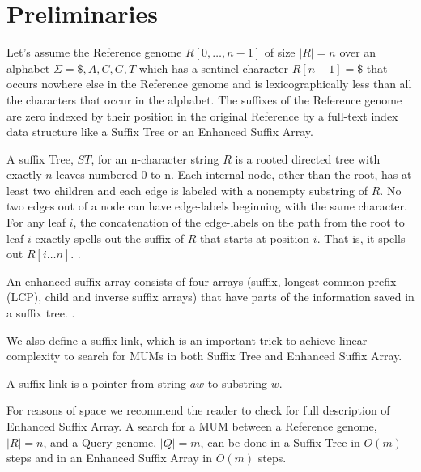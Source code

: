 \documentclass[runningheads,a5paper]{llncs}
\begin{document}
\section{Preliminaries}
Let's assume the Reference genome $R[0,\ldots, n-1]$ of size $|R|=n$ over an alphabet $\Sigma={ \$, A, C, G, T}$ which has a sentinel character $R[n-1] = \$$ that occurs nowhere else in the Reference genome and is lexicographically less than all the characters that occur in the alphabet. The suffixes of the Reference genome are zero indexed by their position in the original Reference by a full-text index data structure like a Suffix Tree or an Enhanced Suffix Array. 
\begin{definition}
A suffix Tree, $ST$, for an n-character string $R$ is a rooted directed tree with exactly $n$ leaves numbered 0 to n. Each internal node, other than the root, has at least two children and each edge is labeled with a nonempty substring of $R$. No two edges out of a node can have edge-labels beginning with the same character. For any leaf $i$, the concatenation of the edge-labels on the path from the root to leaf $i$ exactly spells out the suffix of $R$ that starts at position $i$. That is, it spells out $R[i\ldots n]$. \cite{Gusfield1997}.
\end{definition}
\begin{definition}
  An enhanced suffix array consists of four arrays (suffix, longest common prefix (LCP), child and inverse suffix arrays) that have parts of the information saved in a suffix tree. \cite{Abouelhoda2004}.
\end{definition}
We also define a suffix link, which is an important trick to achieve linear complexity to search for MUMs in both Suffix Tree and Enhanced Suffix Array.
\begin{definition}
A suffix link is a pointer from string $\overline{aw}$ to substring $\overline{w}$.
\end{definition}
For reasons of space we recommend the reader to check \cite{Abouelhoda2004} for full description of Enhanced Suffix Array.
A search for a MUM between a Reference genome, $|R|=n$, and a Query genome, $|Q|=m$,  can be done in a Suffix Tree in $O(m)$ steps and in an Enhanced Suffix Array in $O(m)$ steps.
\end{document}
